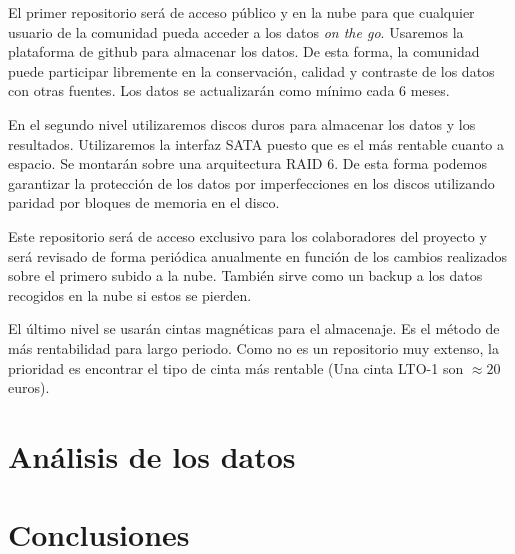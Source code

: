 \documentclass[12pt, spanish]{article}
\begin{document}
El primer repositorio será de acceso público y en la nube para que cualquier usuario de la comunidad pueda acceder a los datos \textit{on the go}. Usaremos la plataforma de github para almacenar los datos. De esta forma, la comunidad puede participar libremente en la conservación, calidad y contraste de los datos con otras fuentes. Los datos se actualizarán como mínimo cada 6 meses.

En el segundo nivel utilizaremos discos duros para almacenar los datos y los resultados. Utilizaremos la interfaz SATA puesto que es el más rentable cuanto a espacio. Se montarán sobre una arquitectura RAID 6. De esta forma podemos garantizar la protección de los datos por imperfecciones en los discos utilizando paridad por bloques de memoria en el disco.

Este repositorio será de acceso exclusivo para los colaboradores del proyecto y será revisado de forma periódica anualmente en función de los cambios realizados sobre el primero subido a la nube. También sirve como un backup a los datos recogidos en la nube si estos se pierden.

El último nivel se usarán cintas magnéticas para el almacenaje. Es el método de más rentabilidad para largo periodo. Como no es un repositorio muy extenso, la prioridad es encontrar el tipo de cinta más rentable (Una cinta LTO-1 son $\approx 20$ euros).
\section{Análisis de los datos}



\section{Conclusiones}

\newpage


\begingroup
	\setlength{\bibsep}{20.0pt}
    
    
\endgroup
\end{document}

